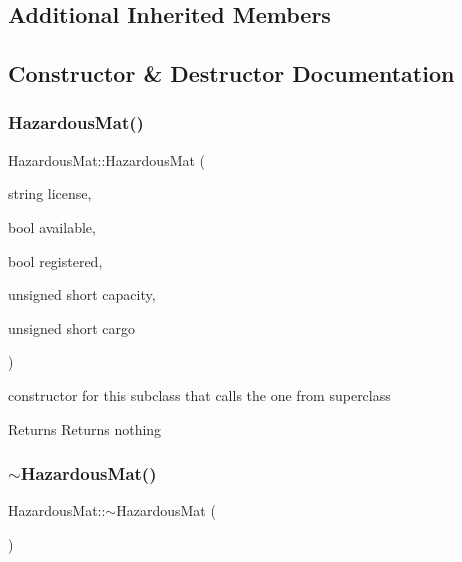 \subsection*{Additional Inherited Members}


\subsection{Constructor \& Destructor Documentation}
\mbox{\label{class_hazardous_mat_adff1b06ba4631c6b3f77168e4b792b1f}} 
\subsubsection{\texorpdfstring{Hazardous\+Mat()}{HazardousMat()}}
{\footnotesize\ttfamily Hazardous\+Mat\+::\+Hazardous\+Mat (\begin{DoxyParamCaption}\item[{string}]{license,  }\item[{bool}]{available,  }\item[{bool}]{registered,  }\item[{unsigned short}]{capacity,  }\item[{unsigned short}]{cargo }\end{DoxyParamCaption})}



constructor for this subclass that calls the one from superclass 

\begin{DoxyReturn}{Returns}
Returns nothing 
\end{DoxyReturn}
\mbox{\label{class_hazardous_mat_aa4304419b08381d4aa46d240ca44738a}} 
\subsubsection{\texorpdfstring{$\sim$\+Hazardous\+Mat()}{~HazardousMat()}}
{\footnotesize\ttfamily Hazardous\+Mat\+::$\sim$\+Hazardous\+Mat (\begin{DoxyParamCaption}{ }\end{DoxyParamCaption})\hspace{0.3cm}{\ttfamily [inline]}}



